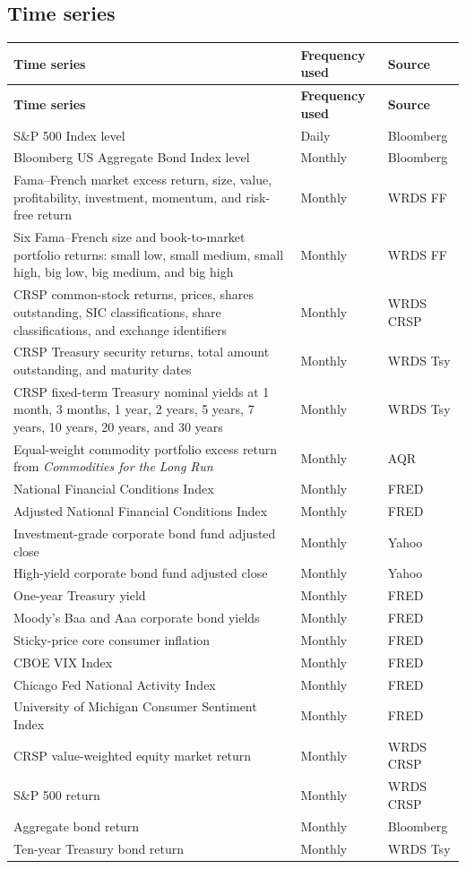 \subsection{Time series}

\begin{longtable}{>{\raggedright\arraybackslash}p{}>{\raggedright\arraybackslash}p{}>{\raggedright\arraybackslash}p{}}
\toprule
\textbf{Time series} & \textbf{Frequency used} & \textbf{Source} \\
\midrule
\endfirsthead
\toprule
\textbf{Time series} & \textbf{Frequency used} & \textbf{Source} \\
\midrule
\endhead
S\&P 500 Index level & Daily & Bloomberg \\
Bloomberg US Aggregate Bond Index level & Monthly & Bloomberg \\
Fama--French market excess return, size, value, profitability, investment, momentum, and risk-free return & Monthly & WRDS FF \\
Six Fama--French size and book-to-market portfolio returns: small low, small medium, small high, big low, big medium, and big high & Monthly & WRDS FF \\
CRSP common-stock returns, prices, shares outstanding, SIC classifications, share classifications, and exchange identifiers & Monthly & WRDS CRSP \\
CRSP Treasury security returns, total amount outstanding, and maturity dates & Monthly & WRDS Tsy \\
CRSP fixed-term Treasury nominal yields at 1 month, 3 months, 1 year, 2 years, 5 years, 7 years, 10 years, 20 years, and 30 years & Monthly & WRDS Tsy \\
Equal-weight commodity portfolio excess return from \textit{Commodities for the Long Run} & Monthly & AQR \\
National Financial Conditions Index & Monthly & FRED \\
Adjusted National Financial Conditions Index & Monthly & FRED \\
Investment-grade corporate bond fund adjusted close & Monthly & Yahoo \\
High-yield corporate bond fund adjusted close & Monthly & Yahoo \\
One-year Treasury yield & Monthly & FRED \\
Moody's Baa and Aaa corporate bond yields & Monthly & FRED \\
Sticky-price core consumer inflation & Monthly & FRED \\
CBOE VIX Index & Monthly & FRED \\
Chicago Fed National Activity Index & Monthly & FRED \\
University of Michigan Consumer Sentiment Index & Monthly & FRED \\
CRSP value-weighted equity market return & Monthly & WRDS CRSP \\
S\&P 500 return & Monthly & WRDS CRSP \\
Aggregate bond return & Monthly & Bloomberg \\
Ten-year Treasury bond return & Monthly & WRDS Tsy \\
\bottomrule
\end{longtable}


